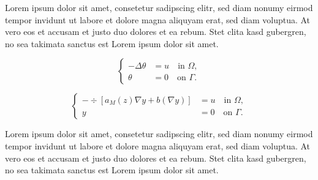 \documentclass{minimal}
\begin{document}
Lorem ipsum dolor sit amet, consetetur sadipscing elitr, sed diam nonumy eirmod
tempor invidunt ut labore et dolore magna aliquyam erat, sed diam voluptua. At
vero eos et accusam et justo duo dolores et ea rebum. Stet clita kasd
gubergren, no sea takimata sanctus est Lorem ipsum dolor sit amet.

    \begin{equation*} 
        \left \{ 
            \begin{aligned}
                -\Delta \theta &= u \quad \text{in } \Omega, \\
                \theta &=0 \quad \text{on } \Gamma.
            \end{aligned}
        \right.
\end{equation*}

    \begin{equation} \label{eq:state2}
        \left\{
            \begin{aligned}
                -\div [a_M(z)\nabla y + b(\nabla y)]  &= u \quad \text{in } \Omega, \\
                y &=0 \quad \text{on } \Gamma.
            \end{aligned}
        \right.
\end{equation}

Lorem ipsum dolor sit amet, consetetur sadipscing elitr, sed diam nonumy eirmod
tempor invidunt ut labore et dolore magna aliquyam erat, sed diam voluptua. At
vero eos et accusam et justo duo dolores et ea rebum. Stet clita kasd
gubergren, no sea takimata sanctus est Lorem ipsum dolor sit amet.
\end{document}
